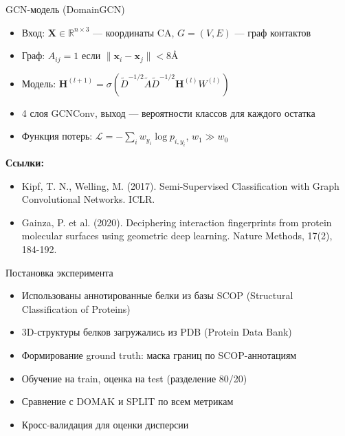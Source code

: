 \documentclass{beamer}
\begin{document}
\begin{frame}{GCN-модель (DomainGCN)}
  \begin{itemize}
    \item Вход: $\mathbf{X} \in \mathbb{R}^{n \times 3}$ — координаты CA, $G=(V,E)$ — граф контактов
    \item Граф: $A_{ij} = 1$ если $\|\mathbf{x}_i - \mathbf{x}_j\| < 8\text{\AA}$
    \item Модель: $\mathbf{H}^{(l+1)} = \sigma(\tilde{D}^{-1/2} \tilde{A} \tilde{D}^{-1/2} \mathbf{H}^{(l)} W^{(l)})$
    \item 4 слоя GCNConv, выход — вероятности классов для каждого остатка
    \item Функция потерь: $\mathcal{L} = -\sum_i w_{y_i} \log p_{i, y_i}$, $w_1 \gg w_0$
  \end{itemize}
  \vspace{0.5em}
  \textbf{Ссылки:}
  \begin{itemize}
    \item \footnotesize Kipf, T. N., Welling, M. (2017). Semi-Supervised Classification with Graph Convolutional Networks. ICLR.
    \item \footnotesize Gainza, P. et al. (2020). Deciphering interaction fingerprints from protein molecular surfaces using geometric deep learning. Nature Methods, 17(2), 184-192.
  \end{itemize}
\end{frame}

\begin{frame}{Постановка эксперимента}
  \begin{itemize}
    \item Использованы аннотированные белки из базы SCOP (Structural Classification of Proteins)
    \item 3D-структуры белков загружались из PDB (Protein Data Bank)
    \item Формирование ground truth: маска границ по SCOP-аннотациям
    \item Обучение на train, оценка на test (разделение 80/20)
    \item Сравнение с DOMAK и SPLIT по всем метрикам
    \item Кросс-валидация для оценки дисперсии
  \end{itemize}
\end{frame}
\end{document}
